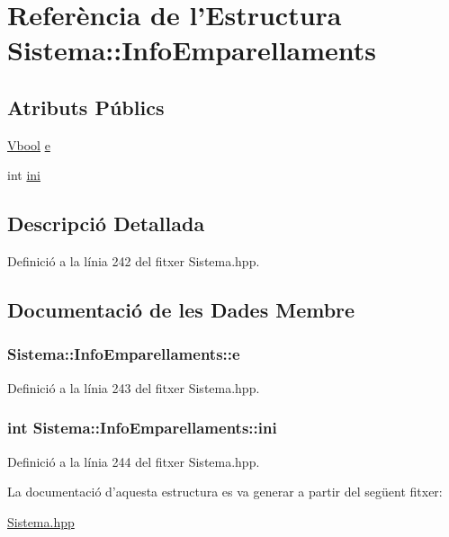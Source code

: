 \hypertarget{struct_sistema_1_1_info_emparellaments}{\section{Referència de l'Estructura Sistema\-:\-:Info\-Emparellaments}
\label{struct_sistema_1_1_info_emparellaments}
}
\subsection*{Atributs Públics}
\begin{DoxyCompactItemize}
\item 
\hyperlink{class_sistema_aed93022dab0bed25a0b6439559ea1b8b}{Vbool} \hyperlink{struct_sistema_1_1_info_emparellaments_ab4101cb4002cf6378372e3a94ffb4bfc}{e}
\item 
int \hyperlink{struct_sistema_1_1_info_emparellaments_a3735afa13bb7aed98f74b9c035b831a0}{ini}
\end{DoxyCompactItemize}


\subsection{Descripció Detallada}


Definició a la línia 242 del fitxer Sistema.\-hpp.



\subsection{Documentació de les Dades Membre}
\hypertarget{struct_sistema_1_1_info_emparellaments_ab4101cb4002cf6378372e3a94ffb4bfc}{
\subsubsection[{e}]{ Sistema\-::\-Info\-Emparellaments\-::e}}\label{struct_sistema_1_1_info_emparellaments_ab4101cb4002cf6378372e3a94ffb4bfc}


Definició a la línia 243 del fitxer Sistema.\-hpp.

\hypertarget{struct_sistema_1_1_info_emparellaments_a3735afa13bb7aed98f74b9c035b831a0}{
\subsubsection[{ini}]{\setlength{\rightskip}{0pt plus 5cm}int Sistema\-::\-Info\-Emparellaments\-::ini}}\label{struct_sistema_1_1_info_emparellaments_a3735afa13bb7aed98f74b9c035b831a0}


Definició a la línia 244 del fitxer Sistema.\-hpp.



La documentació d'aquesta estructura es va generar a partir del següent fitxer\-:\begin{DoxyCompactItemize}
\item 
\hyperlink{_sistema_8hpp}{Sistema.\-hpp}\end{DoxyCompactItemize}
